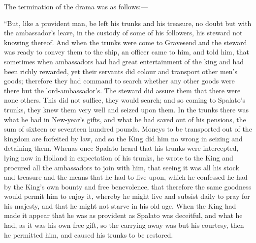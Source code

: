 The termination of the drama was as follows:—

``But, like a provident man, be left
his trunks and his treasure, no doubt but with the ambassador's leave,
in the custody of some of his followers, his steward not knowing
thereof. And when the trunks were come to Gravesend and the steward was
ready to convey them to the ship, an officer came to him, and told him,
that sometimes when ambassadors had had great entertainment of the king
and had been richly rewarded, yet their servants did colour and
transport other men's goods; therefore they had command to search
whether any other goods were there but the lord-ambassador's. The
steward did assure them that there were none others. This did not
suffice, they would search; and so coming to Spalato's trunks, they knew
them very well and seized upon them. In the trunks there was what he had
in New-year's gifts, and what he had saved out of his pensions, the sum
of sixteen or seventeen hundred pounds. Moneys to be transported out of
the kingdom are forfeited by law, and so the King did him no wrong in
seizing and detaining them. Whenas once Spalato heard that his trunks
were intercepted, lying now in Holland in expectation of his trunks, he
wrote to the King and procured all the ambassadors to join with him,
that seeing it was all his stock and treasure and the means that he had
to live upon, which he confessed he had by the King's own bounty and
free benevolence, that therefore the same goodness would permit him to
enjoy it, whereby he might live and subsist daily to pray for his
majesty, and that he might not starve in his old age. When the King had
made it appear that he was as provident as Spalato was deceitful, and
what he had, as it was his own free gift, so the carrying away was but
his courtesy, then he permitted him, and caused his trunks to be
restored.

